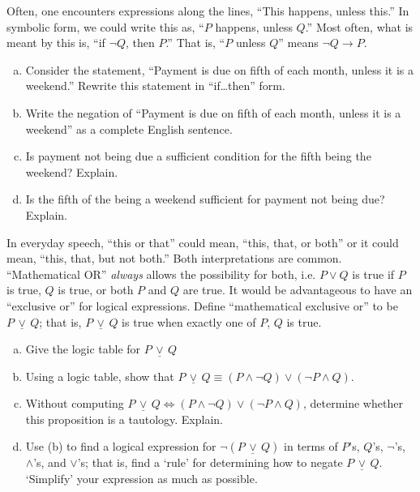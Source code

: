 \documentclass[11pt,letterpaper]{article}
\newcommand{\xor}{\,\underline{\vee}\,}
\begin{document}

 Often, one encounters expressions along the lines, ``This happens, unless this.'' In symbolic form, we could write this as, ``$P$ happens, unless $Q$.'' Most often, what is meant by this is, ``if $\neg Q$, then $P$.'' That is, ``$P$ unless $Q$'' means $\neg Q \to P$. 
	\begin{enumerate}[(a)]
	\item Consider the statement, ``Payment is due on fifth of each month, unless it is a weekend.'' Rewrite this statement in ``if\dots then'' form.  
	\item Write the negation of ``Payment is due on fifth of each month, unless it is a weekend'' as a complete English sentence. 
	\item Is payment not being due a sufficient condition for the fifth being the weekend? Explain. 
	\item Is the fifth of the being a weekend sufficient for payment not being due? Explain. 
	\end{enumerate}



\newpage



 In everyday speech, ``this or that'' could mean, ``this, that, or both'' or it could mean, ``this, that, but not both.'' Both interpretations are common. ``Mathematical OR'' \textit{always} allows the possibility for both, i.e. $P \vee Q$ is true if $P$ is true, $Q$ is true, or both $P$ and $Q$ are true. It would be advantageous to have an ``exclusive or'' for logical expressions. Define ``mathematical exclusive or'' to be $P \xor Q$; that is, $P \xor Q$ is true when exactly one of $P$, $Q$ is true. 
	\begin{enumerate}[(a)]
	\item Give the logic table for $P \xor Q$
	\item Using a logic table, show that $P \xor Q \equiv (P \wedge \neg Q) \vee (\neg P \wedge Q)$.
	\item Without computing $P \xor Q \iff (P \wedge \neg Q) \vee (\neg P \wedge Q)$, determine whether this proposition is a tautology. Explain. 
	\item Use (b) to find a logical expression for $\neg (P \xor Q)$ in terms of $P$'s, $Q$'s, $\neg$'s, $\wedge$'s, and $\vee$'s; that is, find a `rule' for determining how to negate $P \xor Q$. `Simplify' your expression as much as possible. 	
	\end{enumerate}
\end{document}
